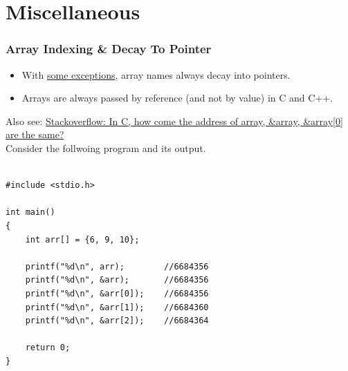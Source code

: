 \documentclass[12pt]{article}
\begin{document}
\tableofcontents

\newpage
{}
\part*{\centering Miscellaneous}





\section*{Array Indexing \& Decay To Pointer}

\begin{itemize}
    \item With \href{https://stackoverflow.com/questions/17752978/exceptions-to-array-decaying-into-a-pointer}{some exceptions}, array names always decay into pointers.
    \item Arrays are always passed by reference (and not by value) in C and C++.
\end{itemize}

\noindent Also see: \href{https://stackoverflow.com/questions/67379858/in-c-how-come-the-address-of-array-array-array0-are-the-same}{Stackoverflow: In C, how come the address of array, \&array, \&array[0] are the same?} \\

\noindent Consider the follwoing program and its output. 

\begin{verbatim}

#include <stdio.h>

int main()
{
    int arr[] = {6, 9, 10};

    printf("%d\n", arr);        //6684356
    printf("%d\n", &arr);       //6684356
    printf("%d\n", &arr[0]);    //6684356
    printf("%d\n", &arr[1]);    //6684360
    printf("%d\n", &arr[2]);    //6684364

    return 0;
}

\end{verbatim}

\end{document}
